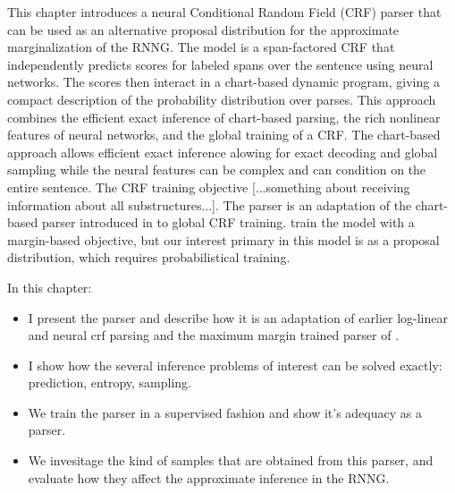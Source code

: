 % 

This chapter introduces a neural Conditional Random Field (CRF) parser that can be used as an alternative proposal distribution for the approximate marginalization of the RNNG. The model is a span-factored CRF that independently predicts scores for labeled spans over the sentence using neural networks. The scores then interact in a chart-based dynamic program, giving a compact description of the probability distribution over parses. This approach combines the efficient exact inference of chart-based parsing, the rich nonlinear features of neural networks, and the global training of a CRF. The chart-based approach allows efficient exact inference alowing for exact decoding and global sampling while the neural features can be complex and can condition on the entire sentence. The CRF training objective [...something about receiving information about all substructures...]. The parser is an adaptation of the chart-based parser introduced in \citet{stern2017minimal} to global CRF training. \citet{stern2017minimal} train the model with a margin-based objective, but our interest primary in this model is as a proposal distribution, which requires probabilistical training.

In this chapter:
\begin{itemize}
  \item I present the parser and describe how it is an adaptation of earlier log-linear and neural crf parsing \citep{finkel2008crf,klein2015crf} and the maximum margin trained parser of \citet{stern2017minimal}.
  \item I show how the several inference problems of interest can be solved exactly: prediction, entropy, sampling.
  \item We train the parser in a supervised fashion and show it's adequacy as a parser.
  \item We invesitage the kind of samples that are obtained from this parser, and evaluate how they affect the approximate inference in the RNNG.
\end{itemize}


